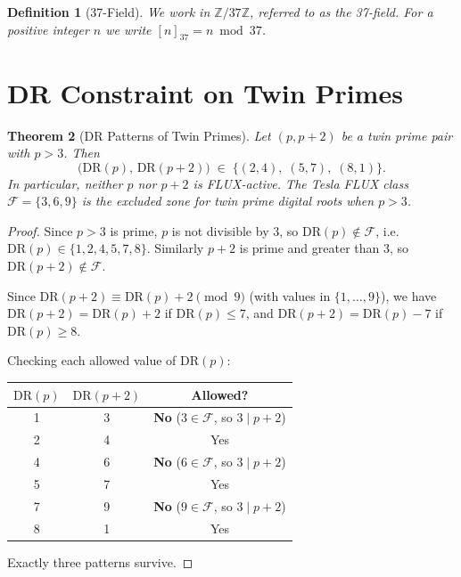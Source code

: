 \documentclass[12pt]{article}
\newtheorem{theorem}{Theorem}[section]
\newtheorem{definition}[theorem]{Definition}
\begin{document}
\begin{definition}[37-Field]
We work in $\mathbb{Z}/37\mathbb{Z}$, referred to as the \emph{37-field}.
For a positive integer $n$ we write $[n]_{37} = n \bmod 37$.
\end{definition}

\section{DR Constraint on Twin Primes}
\label{sec:twin}

\begin{theorem}[DR Patterns of Twin Primes]
\label{thm:twin}
Let $(p, p+2)$ be a twin prime pair with $p > 3$.  Then
\[
    \bigl(\mathrm{DR}(p),\, \mathrm{DR}(p+2)\bigr) \;\in\;
    \{(2,4),\;(5,7),\;(8,1)\}.
\]
In particular, neither $p$ nor $p+2$ is FLUX-active.
The Tesla FLUX class $\mathcal{F} = \{3,6,9\}$ is the
\emph{excluded zone} for twin prime digital roots when $p > 3$.
\end{theorem}

\begin{proof}
Since $p > 3$ is prime, $p$ is not divisible by 3, so $\mathrm{DR}(p) \notin
\mathcal{F}$, i.e.\ $\mathrm{DR}(p) \in \{1,2,4,5,7,8\}$.  Similarly $p+2$
is prime and greater than 3, so $\mathrm{DR}(p+2) \notin \mathcal{F}$.

Since $\mathrm{DR}(p+2) \equiv \mathrm{DR}(p) + 2 \pmod{9}$ (with values in
$\{1,\ldots,9\}$), we have $\mathrm{DR}(p+2) = \mathrm{DR}(p) + 2$ if
$\mathrm{DR}(p) \leq 7$, and $\mathrm{DR}(p+2) = \mathrm{DR}(p) - 7$ if
$\mathrm{DR}(p) \geq 8$.

Checking each allowed value of $\mathrm{DR}(p)$:
\begin{center}
\begin{tabular}{ccc}
\toprule
$\mathrm{DR}(p)$ & $\mathrm{DR}(p+2)$ & Allowed? \\
\midrule
1 & 3 & \textbf{No} ($3 \in \mathcal{F}$, so $3\mid p+2$) \\
2 & 4 & Yes \\
4 & 6 & \textbf{No} ($6 \in \mathcal{F}$, so $3\mid p+2$) \\
5 & 7 & Yes \\
7 & 9 & \textbf{No} ($9 \in \mathcal{F}$, so $3\mid p+2$) \\
8 & 1 & Yes \\
\bottomrule
\end{tabular}
\end{center}
Exactly three patterns survive.
\end{proof}
\end{document}
